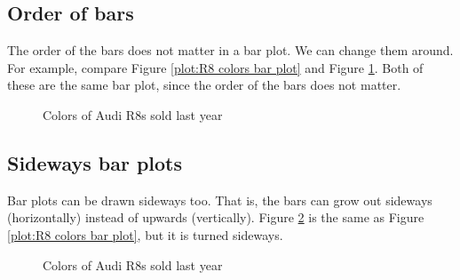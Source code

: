 \documentclass[../../../main.tex]{subfiles}
\begin{document}
\subsection{Order of bars}

The order of the bars does not matter in a bar plot. We can change them around. For example, compare Figure \ref{plot:R8 colors bar plot} and Figure \ref{plot:R8 colors bar plot 2}. Both of these are the same bar plot, since the order of the bars does not matter.

\begin{figure}[ht]
  \caption{\label{plot:R8 colors bar plot 2} Colors of Audi R8s sold last year}
\end{figure}


\subsection{Sideways bar plots}

Bar plots can be drawn sideways too. That is, the bars can grow out sideways (horizontally) instead of upwards (vertically). Figure \ref{plot:R8 colors bar plot sideways} is the same as Figure \ref{plot:R8 colors bar plot}, but it is turned sideways.

\begin{figure}[ht]
  \caption{\label{plot:R8 colors bar plot sideways} Colors of Audi R8s sold last year}
\end{figure}
\end{document}
